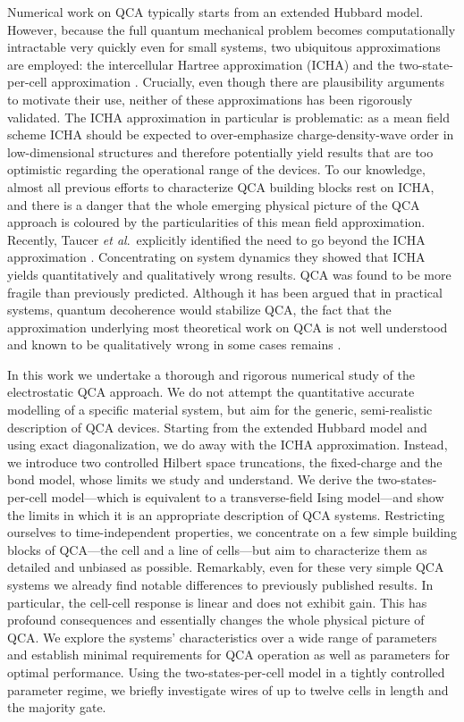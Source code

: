 Numerical work on QCA typically starts from an extended Hubbard model. However,
because the full quantum mechanical problem becomes computationally intractable
very quickly even for small systems, two ubiquitous approximations are employed:
the intercellular Hartree approximation (ICHA) and the two-state-per-cell
approximation \cite{lent1993quantum} \cite{tougaw1996dynamic}. Crucially, even
though there are plausibility arguments to motivate their use, neither of these
approximations has been rigorously validated. The ICHA approximation in
particular is problematic: as a mean field scheme ICHA should be expected to
over-emphasize charge-density-wave order in low-dimensional structures and
therefore potentially yield results that are too optimistic regarding the
operational range of the devices. To our knowledge, almost all previous efforts
to characterize QCA building blocks rest on ICHA, and there is a danger that the
whole emerging physical picture of the QCA approach is coloured by the
particularities of this mean field approximation. Recently, Taucer \emph{et
al}.~explicitly identified the need to go beyond the ICHA approximation
\cite{taucer2012consequences}. Concentrating on system dynamics they showed that
ICHA yields quantitatively and qualitatively wrong results. QCA was found to be
more fragile than previously predicted. Although it has been argued that in
practical systems, quantum decoherence would stabilize QCA, the fact that the
approximation underlying most theoretical work on QCA is not well understood and
known to be qualitatively wrong in some cases remains
\cite{blair2013environmental}.

In this work we undertake a thorough and rigorous numerical study of the
electrostatic QCA approach. We do not attempt the quantitative accurate
modelling of a specific material system, but aim for the generic, semi-realistic
description of QCA devices. Starting from the extended Hubbard model and using
exact diagonalization, we do away with the ICHA approximation. Instead, we
introduce two controlled Hilbert space truncations, the fixed-charge and the
bond model, whose limits we study and understand. We derive the
two-states-per-cell model---which is equivalent to a transverse-field Ising
model---and show the limits in which it is an appropriate description of QCA
systems. Restricting ourselves to time-independent properties, we concentrate on
a few simple building blocks of QCA---the cell and a line of cells---but aim to
characterize them as detailed and unbiased as possible. Remarkably, even for
these very simple QCA systems we already find notable differences to previously
published results. In particular, the cell-cell response is linear and does not
exhibit gain. This has profound consequences and essentially changes the whole
physical picture of QCA. We explore the systems' characteristics over a wide
range of parameters and establish minimal requirements for QCA operation as well
as parameters for optimal performance. Using the two-states-per-cell model in a
tightly controlled parameter regime, we briefly investigate wires of up to
twelve cells in length and the majority gate.

